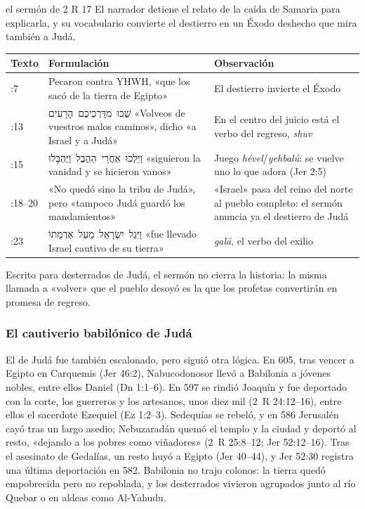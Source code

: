 \documentclass[11pt,letterpaper]{article}
\newcommand{\heb}[1]{\mbox{\foreignlanguage{hebrew}{#1}}}
\begin{document}
\begin{perla}{el sermón de 2 R 17}
El narrador detiene el relato de la caída de Samaria para explicarla, y su vocabulario convierte el destierro en un Éxodo deshecho que mira también a Judá.\par\smallskip
{\centering\renewcommand{\arraystretch}{1.15}
\begin{tabular}{>{\RaggedRight\arraybackslash}p{1.6cm}>{\RaggedRight\arraybackslash}p{5.9cm}>{\RaggedRight\arraybackslash}p{6.4cm}}
\toprule
\textbf{Texto} & \textbf{Formulación} & \textbf{Observación}\\
\midrule
17:7 & Pecaron contra YHWH, «que los sacó de la tierra de Egipto» & El destierro invierte el Éxodo\\
17:13 & \heb{שֻׁבוּ מִדַּרְכֵיכֶם הָרָעִים} «Volveos de vuestros malos caminos», dicho «a Israel y a Judá» & En el centro del juicio está el verbo del regreso, \emph{shuv}\\
17:15 & \heb{וַיֵּלְכוּ אַחֲרֵי הַהֶבֶל וַיֶּהְבָּלוּ} «siguieron la vanidad y se hicieron vanos» & Juego \emph{hével}/\emph{yehbalú}: se vuelve uno lo que adora (Jer 2:5)\\
17:18--20 & «No quedó sino la tribu de Judá», pero «tampoco Judá guardó los mandamientos» & «Israel» pasa del reino del norte al pueblo completo: el sermón anuncia ya el destierro de Judá\\
17:23 & \heb{וַיִּגֶל יִשְׂרָאֵל מֵעַל אַדְמָתוֹ} «fue llevado Israel cautivo de su tierra» & \emph{galá}, el verbo del exilio\\
\bottomrule
\end{tabular}\par}
\smallskip
Escrito para desterrados de Judá, el sermón no cierra la historia: la misma llamada a «volver» que el pueblo desoyó es la que los profetas convertirán en promesa de regreso.
\end{perla}

\subsubsection*{El cautiverio babilónico de Judá}
El de Judá fue también escalonado, pero siguió otra lógica. En 605, tras vencer a Egipto en Carquemis (Jer 46:2), Nabucodonosor llevó a Babilonia a jóvenes nobles, entre ellos Daniel (Dn 1:1--6). En 597 se rindió Joaquín y fue deportado con la corte, los guerreros y los artesanos, unos diez mil (2~R 24:12--16), entre ellos el sacerdote Ezequiel (Ez 1:2--3). Sedequías se rebeló, y en 586 Jerusalén cayó tras un largo asedio; Nebuzaradán quemó el templo y la ciudad y deportó al resto, «dejando a los pobres como viñadores» (2~R 25:8--12; Jer 52:12--16). Tras el asesinato de Gedalías, un resto huyó a Egipto (Jer 40--44), y Jer 52:30 registra una última deportación en 582. Babilonia no trajo colonos: la tierra quedó empobrecida pero no repoblada, y los desterrados vivieron agrupados junto al río Quebar o en aldeas como Al-Yahudu.
\end{document}
